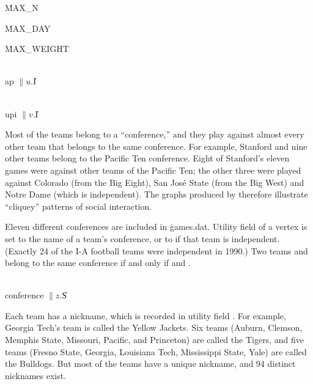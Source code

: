 \Y\B\4\D\.{MAX\_N}\5
\par
\B\4\D\.{MAX\_DAY}\5
\par
\B\4\D\.{MAX\_WEIGHT}\5
\par
\B\4\D\\{ap}\5
$\|u.{}$\|I\par
\B\4\D\\{upi}\5
$\|v.{}$\|I\par
\fi

Most of the teams belong to a ``conference,'' and they play against
almost every other team that belongs to the same conference. For
example, Stanford and nine other teams belong to the
Pacific Ten conference. Eight of Stanford's eleven games were against
other teams of the Pacific Ten; the other three were played against
Colorado (from the Big Eight), San Jos\'e State (from the Big West)
and Notre Dame (which is independent). The graphs produced by 
therefore illustrate ``cliquey'' patterns of social interaction.

Eleven different conferences are included in \.{games.dat}. Utility
field  of a vertex is set to the name of a team's conference, or
to \PB{$\NULL$}
if that team is independent. (Exactly 24 of the I-A football teams
were independent in 1990.) Two teams  and  belong to the same
conference if and only if  and
.

\Y\B\4\D\\{conference}\5
$\|z.{}$\|S\par
\fi

Each team has a nickname, which is recorded in utility field .
For example, Georgia Tech's team is called the Yellow Jackets.
Six teams (Auburn, Clemson, Memphis State, Missouri, Pacific, and
Princeton) are called the Tigers, and five teams
(Fresno State, Georgia, Louisiana Tech, Mississippi State,
Yale) are called the Bulldogs. But most of the teams have a unique
nickname, and 94 distinct nicknames exist.

